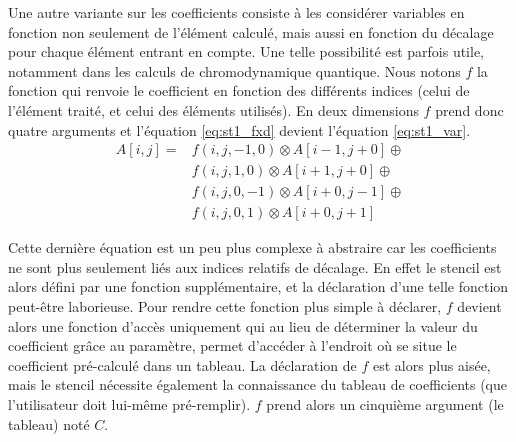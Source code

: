 Une autre variante sur les coefficients consiste à les considérer variables en fonction non seulement de l'élément calculé, mais aussi en fonction du décalage pour chaque élément entrant en compte. Une telle possibilité est parfois utile, notamment dans les calculs de chromodynamique quantique. Nous notons $f$ la fonction qui renvoie le coefficient en fonction des différents indices (celui de l'élément traité, et celui des éléments utilisés). En deux dimensions $f$ prend donc quatre arguments et l'équation \ref{eq:st1_fxd} devient l'équation \ref{eq:st1_var}.
\begin{equation}
\label{eq:st1_var}
\begin{aligned}
A[i,j] = & f(i, j, -1,  0) \otimes A[i-1,j+0] \oplus \\
         & f(i, j,  1,  0) \otimes A[i+1,j+0] \oplus \\
         & f(i, j,  0, -1) \otimes A[i+0,j-1] \oplus \\ 
         & f(i, j,  0,  1) \otimes A[i+0,j+1]
\end{aligned}
\end{equation}

Cette dernière équation est un peu plus complexe à abstraire car les coefficients ne sont plus seulement liés aux indices relatifs de décalage. En effet le stencil est alors défini par une fonction supplémentaire, et la déclaration d'une telle fonction peut-être laborieuse. Pour rendre cette fonction plus simple à déclarer, $f$ devient alors une fonction d'accès uniquement qui au lieu de déterminer la valeur du coefficient grâce au paramètre, permet d'accéder à l'endroit où se situe le coefficient pré-calculé dans un tableau. La déclaration de $f$ est alors plus aisée, mais le stencil nécessite également la connaissance du tableau de coefficients (que l'utilisateur doit lui-même pré-remplir). $f$ prend alors un cinquième argument (le tableau) noté $C$.

